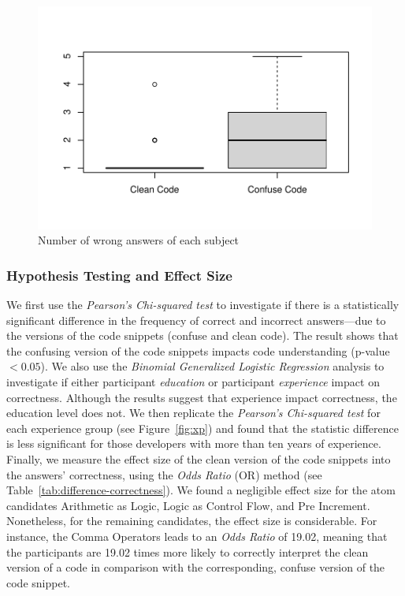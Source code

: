 \begin{figure}[htb!]
\noindent
 \centering
 \includegraphics[width=\columnwidth]{images/wrong-answers-plot-1.pdf}
 \caption{Number of wrong answers of each subject}
 \label{fig:boxplotcorrectness}
 \end{figure}


\subsubsection*{Hypothesis Testing and Effect Size}

We first use the \emph{Pearson's Chi-squared test}
to investigate if there is a statistically significant difference
in the frequency of correct and incorrect answers---due to the versions
of the code snippets (confuse and clean code). The result shows that the confusing version of the code snippets impacts code understanding (p-value $< 0.05$). We also use the \emph{Binomial Generalized Logistic Regression} analysis to investigate if either participant
\emph{education} or participant \emph{experience} impact on correctness. Although the results suggest that experience impact correctness, the education level does not. We then replicate the \emph{Pearson's Chi-squared test} for each experience group (see Figure~\ref{fig:xp}) and found that the statistic difference is less significant for those developers with more than ten years of experience.
Finally, we measure the effect size of the clean version of the code snippets into the answers' correctness, using the \emph{Odds Ratio} (OR)
method (see Table~\ref{tab:difference-correctness}). We found a negligible effect size for the atom candidates Arithmetic as Logic, Logic as Control Flow, and Pre Increment. Nonetheless, for the remaining candidates, the effect size is considerable. For instance, the Comma Operators leads to an \emph{Odds Ratio} of
\num{19.02}, meaning that the participants are \num{19.02} times
more likely to correctly interpret the clean version of a code in comparison with the corresponding, confuse version of the code snippet.


